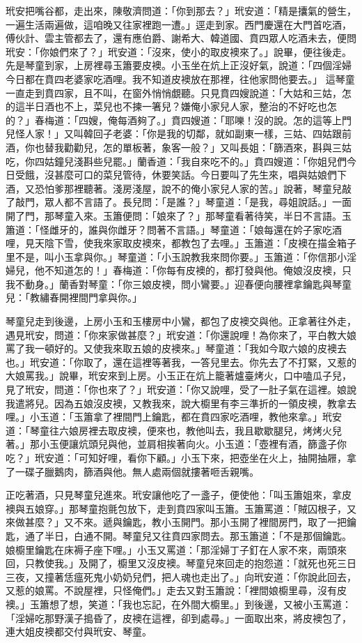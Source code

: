 玳安把嘴谷都，走出來，陳敬濟問道：「你到那去？」玳安道：「精是攮氣的營生，一遍生活兩遍做，這咱晚又往家裡跑一遭。」逕走到家。西門慶還在大門首吃酒，傅伙計、雲主管都去了，還有應伯爵、謝希大、韓道國、賁四眾人吃酒未去，便問玳安：「你娘們來了？」玳安道：「沒來，使小的取皮襖來了。」說畢，便往後走。先是琴童到家，上房裡尋玉簫要皮襖。小玉坐在炕上正沒好氣，說道：「四個淫婦今日都在賁四老婆家吃酒哩。我不知道皮襖放在那裡，往他家問他要去。」 這琴童一直走到賁四家，且不叫，在窗外悄悄覷聽。只見賁四嫂說道：「大姑和三姑，怎的這半日酒也不上，菜兒也不揀一箸兒？嫌俺小家兒人家，整治的不好吃也怎的？」春梅道：「四嫂，俺每酒夠了。」賁四嫂道：「耶嚛！沒的說。怎的這等上門兒怪人家！」又叫韓回子老婆：「你是我的切鄰，就如副東一樣，三姑、四姑跟前酒，你也替我勸勸兒，怎的單板著，象客一般？」又叫長姐：「篩酒來，斟與三姑吃，你四姑鐘兒淺斟些兒罷。」蘭香道：「我自來吃不的。」賁四嫂道：「你姐兒們今日受餓，沒甚麼可口的菜兒管待，休要笑話。今日要叫了先生來，唱與姑娘們下酒，又恐怕爹那裡聽著。淺房淺屋，說不的俺小家兒人家的苦。」說著，琴童兒敲了敲門，眾人都不言語了。長兒問：「是誰？」琴童道：「是我，尋姐說話。」一面開了門，那琴童入來。玉簫便問：「娘來了？」那琴童看著待笑，半日不言語。玉簫道：「怪雌牙的，誰與你雌牙？問著不言語。」琴童道：「娘每還在妗子家吃酒哩，見天陰下雪，使我來家取皮襖來，都教包了去哩。」玉簫道：「皮襖在描金箱子里不是，叫小玉拿與你。」琴童道：「小玉說教我來問你要。」玉簫道：「你信那小淫婦兒，他不知道怎的！」春梅道：「你每有皮襖的，都打發與他。俺娘沒皮襖，只我不動身。」蘭香對琴童：「你三娘皮襖，問小鸞要。」迎春便向腰裡拿鑰匙與琴童兒：「教繡春開裡間門拿與你。」

琴童兒走到後邊，上房小玉和玉樓房中小鸞，都包了皮襖交與他。正拿著往外走，遇見玳安，問道：「你來家做甚麼？」玳安道：「你還說哩！為你來了，平白教大娘罵了我一頓好的。又使我來取五娘的皮襖來。」琴童道：「我如今取六娘的皮襖去也。」玳安道：「你取了，還在這裡等著我，一答兒里去。你先去了不打緊，又惹的大娘罵我。」說畢，玳安來到上房。小玉正在炕上籠著爐臺烤火，口中嗑瓜子兒，見了玳安，問道：「你也來了？」玳安道：「你又說哩，受了一肚子氣在這裡。娘說我遣將兒。因為五娘沒皮襖，又教我來，說大櫥里有李三準折的一領皮襖，教拿去哩。」小玉道：「玉簫拿了裡間門上鑰匙，都在賁四家吃酒哩，教他來拿。」玳安道：「琴童往六娘房裡去取皮襖，便來也，教他叫去，我且歇歇腿兒，烤烤火兒著。」那小玉便讓炕頭兒與他，並肩相挨著向火。小玉道：「壺裡有酒，篩盞子你吃？」玳安道：「可知好哩，看你下顧。」小玉下來，把壺坐在火上，抽開抽屜，拿了一碟子臘鵝肉，篩酒與他。無人處兩個就摟著咂舌親嘴。

正吃著酒，只見琴童兒進來。玳安讓他吃了一盞子，便使他：「叫玉簫姐來，拿皮襖與五娘穿。」那琴童抱氈包放下，走到賁四家叫玉簫。玉簫罵道：「賊囚根子，又來做甚麼？」又不來。遞與鑰匙，教小玉開門。那小玉開了裡間房門，取了一把鑰匙，通了半日，白通不開。琴童兒又往賁四家問去。那玉簫道：「不是那個鑰匙。娘櫥里鑰匙在床褥子座下哩。」小玉又罵道：「那淫婦丁子釘在人家不來，兩頭來回，只教使我。」及開了，櫥里又沒皮襖。琴童兒來回走的抱怨道：「就死也死三日三夜，又撞著恁瘟死鬼小奶奶兒們，把人魂也走出了。」向玳安道：「你說此回去，又惹的娘罵。不說屋裡，只怪俺們。」走去又對玉簫說：「裡間娘櫥里尋，沒有皮襖。」玉簫想了想，笑道：「我也忘記，在外間大櫥里。」到後邊，又被小玉罵道：「淫婦吃那野漢子搗昏了，皮襖在這裡，卻到處尋。」一面取出來，將皮襖包了，連大姐皮襖都交付與玳安、琴童。

